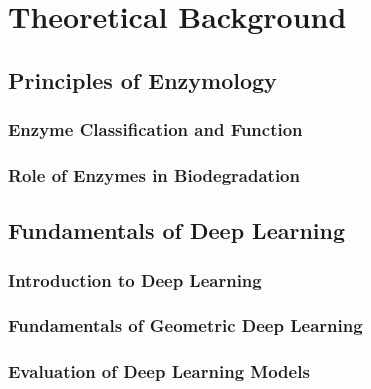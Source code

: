 \section*{Theoretical Background}

\subsection{Principles of Enzymology}
\label{sec:Principles of Enzymology}

\subsubsection{Enzyme Classification and Function}
\label{sec:Enzyme Classification and Function}

\subsubsection{Role of Enzymes in Biodegradation}
\label{sec:Role of Enzymes in Biodegradation}

\subsection{Fundamentals of Deep Learning}
\label{sec:Fundamentals of Deep Learning}

\subsubsection{Introduction to Deep Learning}
\label{sec:Introduction to Deep Learning}

\subsubsection{Fundamentals of Geometric Deep Learning}
\label{sec:Fundamentals of Geometric Deep Learning}

\subsubsection{Evaluation of Deep Learning Models}
\label{sec:Evaluation of Deep Learning Models}
